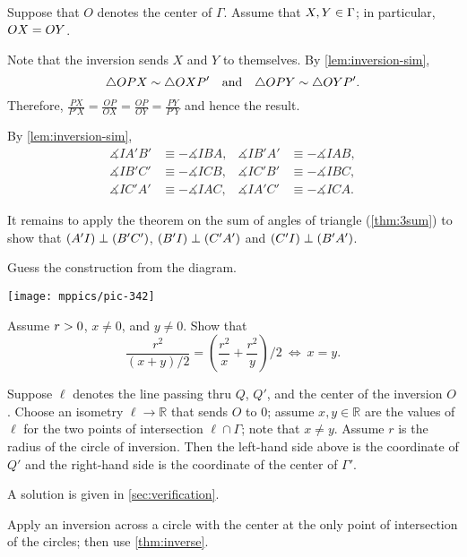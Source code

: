 Suppose that $O$ denotes the center of $\Gamma$.
Assume that $X,Y\in \Gamma$;
in particular, $OX=OY$.



Note that the inversion sends $X$ and $Y$ to themselves.
By \ref{lem:inversion-sim},
$$\triangle OPX\sim \triangle OXP'
\quad
\text{and}
\quad
\triangle OPY\sim \triangle OYP'.$$
Therefore, 
$\frac{PX}{P'X}=\frac{OP}{OX}=\frac{OP}{OY}=\frac{PY}{P'Y}$
and hence the result.

By \ref{lem:inversion-sim},
\begin{align*}
\measuredangle IA'B'&\equiv -\measuredangle IBA,
&
\measuredangle IB'A'&\equiv -\measuredangle IAB,
\\
\measuredangle IB'C'&\equiv -\measuredangle ICB,
&
\measuredangle IC'B'&\equiv -\measuredangle IBC,
\\
\measuredangle IC'A'&\equiv -\measuredangle IAC,
&
\measuredangle IA'C'&\equiv -\measuredangle ICA.
\end{align*}

It remains to apply the theorem on the sum of angles of triangle (\ref{thm:3sum})
to show that $(A'I)\perp (B'C')$, 
$(B'I)\perp (C'A')$
and
$(C'I)\perp (B'A')$.

Guess the construction from the diagram.

\begin{Figure}
\vskip-0mm
\centering
\texttt{[image: mppics/pic-342]}
\end{Figure}

Assume $r>0$, $x\ne 0$, and $y\ne 0$.
Show that
$$\frac{r^2}{(x+y)/2}
=
\left(\frac {r^2}x+\frac {r^2}y\right)/2\ \iff\ x=y.$$

Suppose $\ell$ denotes the line passing thru $Q$, $Q'$, and the center of the inversion $O$.
Choose an isometry $\ell\to\mathbb{R}$ that sends $O$ to $0$;
assume $x,y\in \mathbb{R}$ are the values of $\ell$ for the two points of intersection $\ell\cap\Gamma$;
note that $x\ne y$.
Assume $r$ is the radius of the circle of inversion.
Then the left-hand side above is the coordinate of $Q'$ 
and the right-hand side is the coordinate of the center of $\Gamma'$.

A solution is given in \ref{sec:verification}.

Apply an inversion across a circle with the center at the only point of intersection of the circles;
then use \ref{thm:inverse}.


